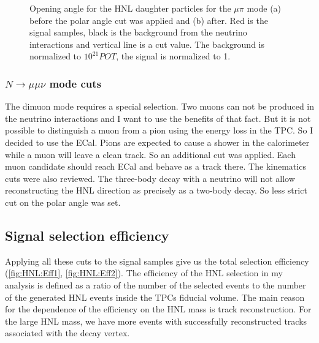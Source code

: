 \documentclass[../main.tex]{subfiles}
\begin{document}
\begin{figure}[!ht]
  \begin{minipage}[h]{0.49\linewidth}
  \end{minipage}
  \hfill
  \begin{minipage}[h]{0.49\linewidth}
  \end{minipage}
  \caption{Opening angle for the HNL daughter particles for the $\mu\pi$ mode (a) before the polar angle cut was applied and (b) after. Red is the signal samples, black is the background from the neutrino interactions and vertical line is a cut value. The background is normalized to $10^{21}POT$, the signal is normalized to 1.}
  \label{fig:HNL:kin2}
\end{figure}

\subsubsection{\texorpdfstring{$N\to\mu\mu\nu$}{Lg}  mode cuts}
The dimuon mode requires a special selection. Two muons can not be produced in the neutrino interactions and I want to use the benefits of that fact. But it is not possible to distinguish a muon from a pion using the energy loss in the TPC. So I decided to use the ECal. Pions are expected to cause a shower in the calorimeter while a muon will leave a clean track. So an additional cut was applied. Each muon candidate should reach ECal and behave as a track there. The kinematics cuts were also reviewed. The three-body decay with a neutrino will not allow reconstructing the HNL direction as precisely as a two-body decay. So less strict cut on the polar angle was set.

\subsection{Signal selection efficiency}
\label{sec:HNL:eff}

Applying all these cuts to the signal samples give us the total selection efficiency (\autoref{fig:HNL:Eff1}, \autoref{fig:HNL:Eff2}). The efficiency of the HNL selection in my analysis is defined as a ratio of the number of the selected events to the number of the generated HNL events inside the TPCs fiducial volume. The main reason for the dependence of the efficiency on the HNL mass is track reconstruction. For the large HNL mass, we have more events with successfully reconstructed tracks associated with the decay vertex.
\end{document}

